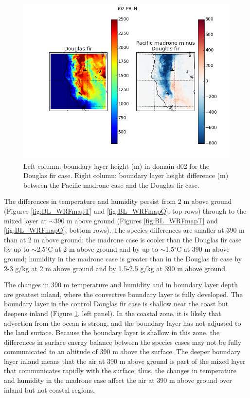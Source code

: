 \begin{figure}[here]
\includegraphics[width=1\textwidth]{ch2-BL/figures/PBLH_d02_s0pt08.png}
\caption{Left column: boundary layer height (m) in domain d02 for the Douglas fir case.  Right column: boundary layer height difference (m) between the Pacific madrone case and the Douglas fir case.}
\label{fig:BL_WRFmapPBLH}
\end{figure}

The differences in temperature and humidity persist from 2 m above ground (Figures \ref{fig:BL_WRFmapT} and \ref{fig:BL_WRFmapQ}, top rows) through to the mixed layer at $\sim$390 m above ground (Figures \ref{fig:BL_WRFmapT} and \ref{fig:BL_WRFmapQ}, bottom rows). The species differences are smaller at 390 m than at 2 m above ground: the madrone case is cooler than the Douglas fir case by up to $\sim$2.5$^\circ$C at 2 m above ground and by up to $\sim$1.5$^\circ$C at 390 m above ground; humidity in the madrone case is greater than in the Douglas fir case by 2-3 g/kg at 2 m above ground and by 1.5-2.5 g/kg at 390 m above ground.

The changes in 390 m temperature and humidity and in boundary layer depth are greatest inland, where the convective boundary layer is fully developed.  The boundary layer in the control Douglas fir case is shallow near the coast but deepens inland (Figure \ref{fig:BL_WRFmapPBLH}, left panel).  In the coastal zone, it is likely that advection from the ocean is strong, and the boundary layer has not adjusted to the land surface.  Because the boundary layer is shallow in this zone, the differences in surface energy balance between the species cases may not be fully communicated to an altitude of 390 m above the surface.  The deeper boundary layer inland means that the air at 390 m above ground is part of the mixed layer that communicates rapidly with the surface; thus, the changes in temperature and humidity in the madrone case affect the air at 390 m above ground over inland but not coastal regions.


